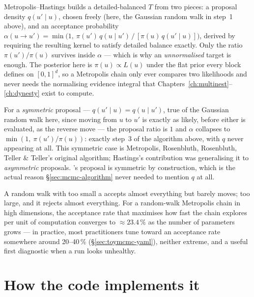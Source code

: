 Metropolis--Hastings builds a detailed-balanced $T$ from two pieces: a proposal
density $q(u' \mid u)$, chosen freely (here, the Gaussian random walk in step~1
above), and an acceptance probability $\alpha(u \to u') = \min\big(1,\ \pi(u')\,q(u
\mid u')\,/\,[\pi(u)\,q(u' \mid u)]\big)$, derived by requiring the resulting kernel
to satisfy detailed balance exactly\cite{Metropolis:1953,Hastings:1970}. Only the
ratio $\pi(u')/\pi(u)$ survives inside $\alpha$ --- which is why an
\emph{unnormalised} target is enough. The posterior here is $\pi(u) \propto L(u)$
under the flat prior every  block defines on $[0,1]^d$, so a
Metropolis chain only ever compares two likelihoods and never needs the normalising
evidence integral that Chapters~\ref{ch:multinest}--\ref{ch:dynesty} exist to
compute.

For a \emph{symmetric} proposal --- $q(u' \mid u) = q(u \mid u')$, true of the
Gaussian random walk here, since moving from $u$ to $u'$ is exactly as likely, before
either is evaluated, as the reverse move --- the proposal ratio is $1$ and $\alpha$
collapses to $\min(1,\ \pi(u')/\pi(u))$: exactly step~3 of the algorithm above, with
$q$ never appearing at all. This symmetric case is Metropolis, Rosenbluth,
Rosenbluth, Teller \& Teller's original algorithm\cite{Metropolis:1953}; Hastings's
contribution\cite{Hastings:1970} was generalising it to \emph{asymmetric} proposals.
's proposal is symmetric by construction, which is the actual reason
\S\ref{sec:mcmc-algorithm} never needed to mention $q$ at all.

\begin{jtip}
A random walk with too small a  accepts almost everything
but barely moves; too large, and it rejects almost everything. For a random-walk
Metropolis chain in high dimensions, the acceptance rate that maximises how fast the
chain explores per unit of computation converges to $\approx 23.4\,\%$ as the number
of parameters grows\cite{RobertsGelmanGilks:1997} --- in practice, most
practitioners tune toward an acceptance rate somewhere around 20--40\,\%
(\S\ref{sec:toymcmc-yaml}), neither extreme, and a useful first diagnostic when a run
looks unhealthy.
\end{jtip}

\section{How the code implements it}
\label{sec:toymcmc-code}

